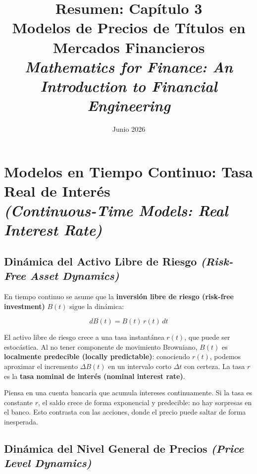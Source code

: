 \documentclass[12pt]{article}
\title{\textbf{Resumen: Cap\'itulo 3}\\
\large Modelos de Precios de T\'itulos en Mercados Financieros\\
\normalsize \textit{Mathematics for Finance: An Introduction to Financial Engineering}}
\author{}
\date{Junio 2026}
\begin{document}
\maketitle
\tableofcontents
\newpage

\section{Modelos en Tiempo Continuo: Tasa Real de Inter\'es\\
\textit{(Continuous-Time Models: Real Interest Rate)}}

\subsection{Din\'amica del Activo Libre de Riesgo \textit{(Risk-Free Asset Dynamics)}}

En tiempo continuo se asume que la \textbf{inversi\'on libre de riesgo (risk-free investment)} $B(t)$ sigue la din\'amica:

\begin{equation}
  dB(t) = B(t)\,r(t)\,dt
\end{equation}

\begin{intuicionmat}
El activo libre de riesgo crece a una tasa instant\'anea $r(t)$, que puede ser estoc\'astica. Al no tener componente de movimiento Browniano, $B(t)$ es \textbf{localmente predecible (locally predictable)}: conociendo $r(t)$, podemos aproximar el incremento $\Delta B(t)$ en un intervalo corto $\Delta t$ con certeza. La tasa $r$ es la \textbf{tasa nominal de inter\'es (nominal interest rate)}.
\end{intuicionmat}

\begin{intuicion}
Piensa en una cuenta bancaria que acumula intereses continuamente. Si la tasa es constante $r$, el saldo crece de forma exponencial y predecible: no hay sorpresas en el banco. Esto contrasta con las acciones, donde el precio puede saltar de forma inesperada.
\end{intuicion}

\subsection{Din\'amica del Nivel General de Precios \textit{(Price Level Dynamics)}}
\end{document}
